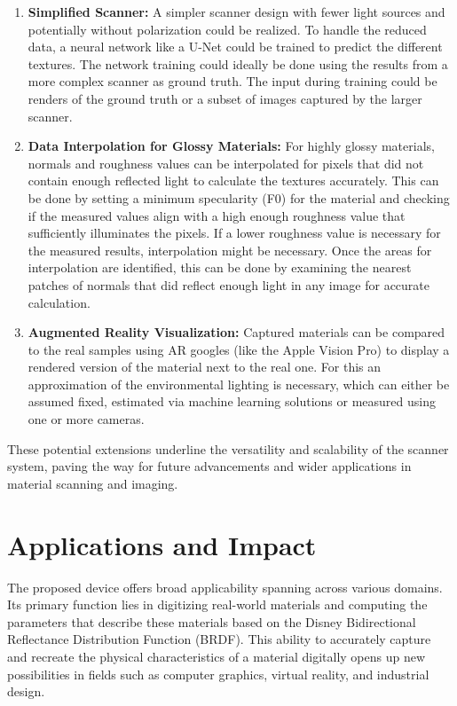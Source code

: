\documentclass[11pt, twoside, listof=totocnumbered, bibliography=totocnumbered]{scrartcl}
\begin{document}
\begin{enumerate}
	\item \textbf{Simplified Scanner:} A simpler scanner design with fewer light sources and potentially without polarization could be realized. To handle the reduced data, a neural network like a U-Net could be trained to predict the different textures. The network training could ideally be done using the results from a more complex scanner as ground truth. The input during training could be renders of the ground truth or a subset of images captured by the larger scanner.
	\item \textbf{Data Interpolation for Glossy Materials:} For highly glossy materials, normals and roughness values can be interpolated for pixels that did not contain enough reflected light to calculate the textures accurately. This can be done by setting a minimum specularity (F0) for the material and checking if the measured values align with a high enough roughness value that sufficiently illuminates the pixels. If a lower roughness value is necessary for the measured results, interpolation might be necessary. Once the areas for interpolation are identified, this can be done by examining the nearest patches of normals that did reflect enough light in any image for accurate calculation.
	\item \textbf{Augmented Reality Visualization:} Captured materials can be compared to the real samples using AR googles (like the Apple Vision Pro) to display a rendered version of the material next to the real one. For this an approximation of the environmental lighting is necessary, which can either be assumed fixed, estimated via machine learning solutions or measured using one or more cameras.
\end{enumerate}

These potential extensions underline the versatility and scalability of the scanner system, paving the way for future advancements and wider applications in material scanning and imaging.

\section{Applications and Impact}
The proposed device offers broad applicability spanning across various domains. Its primary function lies in digitizing real-world materials and computing the parameters that describe these materials based on the Disney Bidirectional Reflectance Distribution Function (BRDF).\cite{DISNEY_BRDF} This ability to accurately capture and recreate the physical characteristics of a material digitally opens up new possibilities in fields such as computer graphics, virtual reality, and industrial design.
\end{document}

